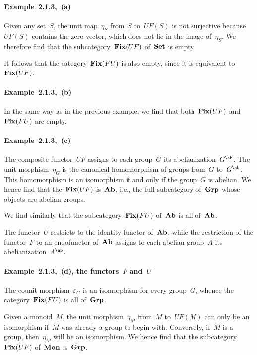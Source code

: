\subsubsection{}

\paragraph{Example~2.1.3,~(a)}
Given any set~$S$, the unit map~$η_S$ from~$S$ to~$UF(S)$ is not surjective because~$UF(S)$ contains the zero vector, which does not lie in the image of~$η_S$.
We therefore find that the subcategory~$\mathop{\mathbf{Fix}}(UF)$ of~$\mathbf{Set}$ is empty.

It follows that the category~$\mathop{\mathbf{Fix}}(FU)$ is also empty, since it is equivalent to~$\mathop{\mathbf{Fix}}(UF)$.

\paragraph{Example~2.1.3,~(b)}
In the same way as in the previous example, we find that both~$\mathop{\mathbf{Fix}}(UF)$ and~$\mathop{\mathbf{Fix}}(FU)$ are empty.

\paragraph{Example~2.1.3,~(c)}
The composite functor~$UF$ assigns to each group~$G$ its abelianization~$G^{\ab}$.
The unit morphism~$η_G$ is the canonical homomorphism of groups from~$G$ to~$G^{\ab}$.
This homomorphism is an isomorphism if and only if the group~$G$ is abelian.
We hence find that the~$\mathop{\mathbf{Fix}}(UF)$ is~$\mathbf{Ab}$, i.e., the full subcategory of~$\mathbf{Grp}$ whose objects are abelian groups.

We find similarly that the subcategory~$\mathop{\mathbf{Fix}}(FU)$ of~$\mathbf{Ab}$ is all of~$\mathbf{Ab}$.

The functor~$U$ restricts to the identity functor of~$\mathbf{Ab}$, while the restriction of the functor~$F$ to an endofunctor of~$\mathbf{Ab}$ assigns to each abelian group~$A$ its abelianization~$A^{\ab}$.

\paragraph{Example~2.1.3,~(d), the functors~$F$ and~$U$}
The counit morphism~$ε_G$ is an isomorphism for every group~$G$, whence the category~$\mathop{\mathbf{Fix}}(FU)$ is all of~$\mathbf{Grp}$.

Given a monoid~$M$, the unit morphism~$η_M$ from~$M$ to~$UF(M)$ can only be an isomorphism if~$M$ was already a group to begin with.
Conversely, if~$M$ is a group, then~$η_M$ will be an isomorphism.
We hence find that the subcategory~$\mathop{\mathbf{Fix}}(UF)$ of~$\mathbf{Mon}$ is~$\mathbf{Grp}$.

